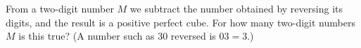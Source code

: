 From a two-digit number $M$ we subtract the number obtained by reversing its digits, and the result is a positive perfect cube. For how many two-digit numbers $M$ is this true? (A number such as $30$ reversed is $03=3$.)
